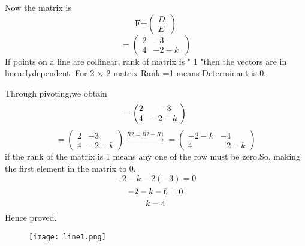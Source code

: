 \documentclass[10pt, a4paper]{article}
\begin{document}
\boldmath
Now the matrix is\\
\begin{equation}\label{eq:}
\textbf{F=$\begin{pmatrix} D\\ E\ \end{pmatrix}$}
\end{equation}
\unboldmath
\begin{equation} \label{eq:}
=\begin{pmatrix} 2 & -3\\ 4 & -2-k \ \end{pmatrix} 
\end{equation}
If  points on a line  are  collinear, rank of matrix is " 1 "then the vectors are in linearlydependent.
For 2 × 2 matrix Rank =1 means Determinant is 0.

Through pivoting,we obtain\\
\begin{equation}\label{eq:}
=\begin{pmatrix} 2 & -3\\ 4 & -2-k \ \end{pmatrix} \\ 
\end{equation}
\begin{equation}\label{eq:}
=\begin{pmatrix}
2 &-3 \\ 
 4& -2-k
\end{pmatrix}\overset{R2=R2-R1}{\rightarrow}
=\begin{pmatrix}
-2-k &-4 \\ 
 4& -2-k
\end{pmatrix}
\end{equation} 
if the rank of the matrix is 1 means any one of the row must be zero.So, making the first element in the matrix to 0.
\begin{equation}\label{eq:}
-2-k-2(-3)=0
\end{equation} 
\begin{equation}\label{eq:}
-2-k-6=0\\
\end{equation} 
\begin{equation}\label{eq:}
k=4 \\
\end{equation} 
Hence proved.

 \begin{figure}[h!]
	  \centering 
	  \texttt{[image: line1.png]}
	  \caption{}
	  \label{fig:line.png}
\end{figure}
\end{document}
